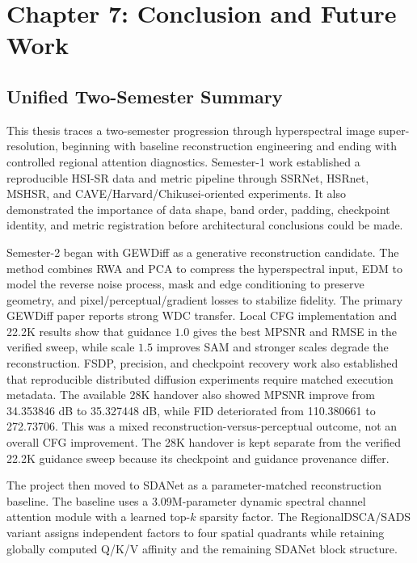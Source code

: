 \documentclass[10pt,twocolumn,letterpaper]{article}
\begin{document}
\FloatBarrier
\section{Chapter 7: Conclusion and Future Work}
\label{sec:conclusion}

\subsection{Unified Two-Semester Summary}

This thesis traces a two-semester progression through hyperspectral image super-resolution, beginning with baseline reconstruction engineering and ending with controlled regional attention diagnostics. Semester-1 work established a reproducible HSI-SR data and metric pipeline through SSRNet, HSRnet, MSHSR, and CAVE/Harvard/Chikusei-oriented experiments. It also demonstrated the importance of data shape, band order, padding, checkpoint identity, and metric registration before architectural conclusions could be made.

Semester-2 began with GEWDiff as a generative reconstruction candidate. The method combines RWA and PCA to compress the hyperspectral input, EDM to model the reverse noise process, mask and edge conditioning to preserve geometry, and pixel/perceptual/gradient losses to stabilize fidelity. The primary GEWDiff paper reports strong WDC transfer. Local CFG implementation and 22.2K results show that guidance $1.0$ gives the best MPSNR and RMSE in the verified sweep, while scale $1.5$ improves SAM and stronger scales degrade the reconstruction. FSDP, precision, and checkpoint recovery work also established that reproducible distributed diffusion experiments require matched execution metadata. The available 28K handover also showed MPSNR improve from 34.353846 dB to 35.327448 dB, while FID deteriorated from 110.380661 to 272.73706. This was a mixed reconstruction-versus-perceptual outcome, not an overall CFG improvement. The 28K handover is kept separate from the verified 22.2K guidance sweep because its checkpoint and guidance provenance differ.

The project then moved to SDANet as a parameter-matched reconstruction baseline. The baseline uses a 3.09M-parameter dynamic spectral channel attention module with a learned top-$k$ sparsity factor. The RegionalDSCA/SADS variant assigns independent factors to four spatial quadrants while retaining globally computed Q/K/V affinity and the remaining SDANet block structure.
\end{document}
